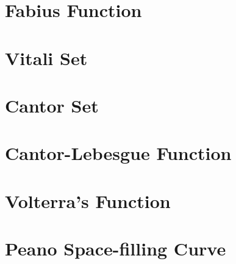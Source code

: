 \documentclass{report}
\begin{document}
\section{Fabius Function}
\section{Vitali Set}
\section{Cantor Set}
\section{Cantor-Lebesgue Function}
\section{Volterra's Function}
\section{Peano Space-filling Curve}
\end{document}
